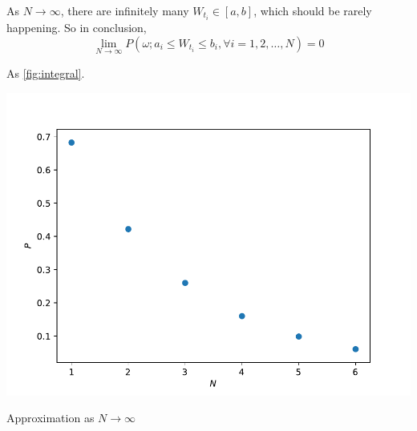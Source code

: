 \documentclass{homework}
\begin{document}
\begin{subproblem}[\roman*)]
        \item
        As $N\to\infty$, there are infinitely many $W_{t_i}\in[a,b]$,
        which should be rarely happening. So in conclusion,
        \[\lim_{N\to\infty}P\left(
            \omega;
            a_i\leq W_{t_i}\leq b_i,
            \forall i=1,2,\ldots,N
        \right)=0\]
        
        \item
        As 
        \cref{fig:integral}.
        \begin{marginfigure}
            \centering
            \includegraphics[width=\columnwidth]{integral}
            \caption{Approximation as $N\to\infty$}
            \label{fig:integral}
        \end{marginfigure}
    \end{subproblem}

    \problem
\end{document}
